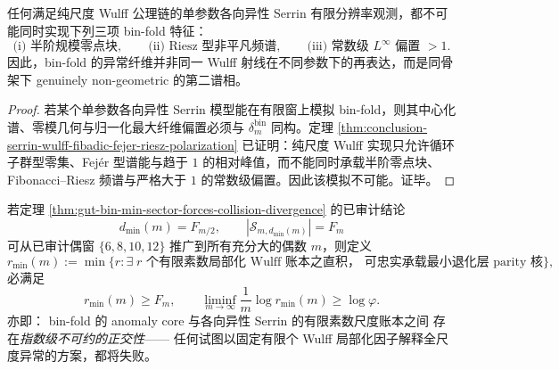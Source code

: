 \begin{corollary}\label{cor:conclusion-serrin-single-parameter-cannot-simulate-binfold-anomaly}
任何满足纯尺度 Wulff 公理链的单参数各向异性 Serrin 有限分辨率观测，都不可能同时实现下列三项 bin-fold 特征：
\[
\text{(i) 半阶规模零点块},\qquad
\text{(ii) Riesz 型非平凡频谱},\qquad
\text{(iii) 常数级 }L^\infty\text{ 偏置 } >1.
\]
因此，bin-fold 的异常纤维并非同一 Wulff 射线在不同参数下的再表达，而是同骨架下 genuinely non-geometric 的第二谱相。
\end{corollary}
\begin{proof}
若某个单参数各向异性 Serrin 模型能在有限窗上模拟 bin-fold，则其中心化谱、零模几何与归一化最大纤维偏置必须与 \(\delta_m^{\mathrm{bin}}\) 同构。定理 \ref{thm:conclusion-serrin-wulff-fibadic-fejer-riesz-polarization} 已证明：纯尺度 Wulff 实现只允许循环子群型零集、Fej\'er 型谱能与趋于 \(1\) 的相对峰值，而不能同时承载半阶零点块、Fibonacci--Riesz 频谱与严格大于 \(1\) 的常数级偏置。因此该模拟不可能。证毕。
\end{proof}

\begin{conjecture}\label{conj:conclusion-serrin-wulff-parity-scale-orthogonality}
若定理 \ref{thm:gut-bin-min-sector-forces-collision-divergence}
的已审计结论
\[
d_{\min}(m)=F_{m/2},
\qquad
|\mathcal S_{m,d_{\min}(m)}|=F_m
\]
可从已审计偶窗 \(\{6,8,10,12\}\)
推广到所有充分大的偶数 \(m\)，则定义
\[
r_{\min}(m)
:=
\min\bigl\{r:
\exists\;\text{\(r\) 个有限素数局部化 Wulff 账本之直积，
可忠实承载最小退化层 parity 核}\bigr\},
\]
必满足
\[
r_{\min}(m)\ge F_m,
\qquad
\liminf_{m\to\infty}\frac1m\log r_{\min}(m)\ge \log\varphi.
\]
亦即：
bin-fold 的 anomaly core 与各向异性 Serrin 的有限素数尺度账本之间
存在\emph{指数级不可约的正交性}——
任何试图以固定有限个 Wulff 局部化因子解释全尺度异常的方案，都将失败。
\end{conjecture}
